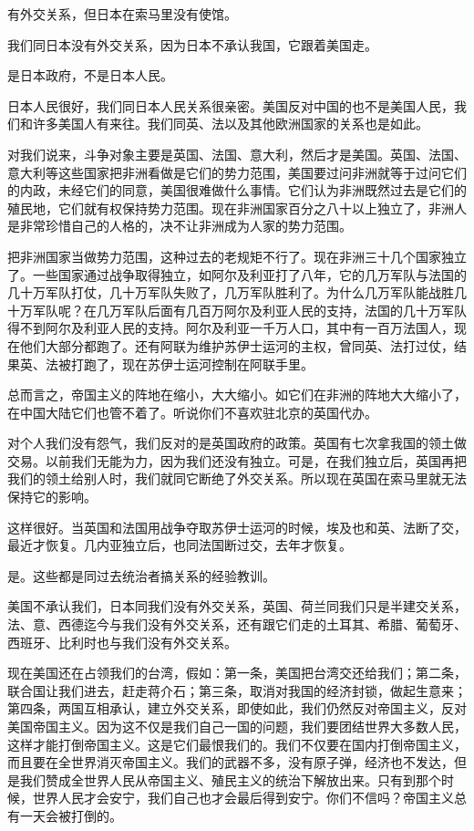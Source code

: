 有外交关系，但日本在索马里没有使馆。

我们同日本没有外交关系，因为日本不承认我国，它跟着美国走。

是日本政府，不是日本人民。

日本人民很好，我们同日本人民关系很亲密。美国反对中国的也不是美国人民，我们和许多美国人有来往。我们同英、法以及其他欧洲国家的关系也是如此。

对我们说来，斗争对象主要是英国、法国、意大利，然后才是美国。英国、法国、意大利等这些国家把非洲看做是它们的势力范围，美国要过问非洲就等于过问它们的内政，未经它们的同意，美国很难做什么事情。它们认为非洲既然过去是它们的殖民地，它们就有权保持势力范围。现在非洲国家百分之八十以上独立了，非洲人是非常珍惜自己的人格的，决不让非洲成为人家的势力范围。

把非洲国家当做势力范围，这种过去的老规矩不行了。现在非洲三十几个国家独立了。一些国家通过战争取得独立，如阿尔及利亚打了八年，它的几万军队与法国的几十万军队打仗，几十万军队失败了，几万军队胜利了。为什么几万军队能战胜几十万军队呢？在几万军队后面有几百万阿尔及利亚人民的支持，法国的几十万军队得不到阿尔及利亚人民的支持。阿尔及利亚一千万人口，其中有一百万法国人，现在他们大部分都跑了。还有阿联为维护苏伊士运河的主权，曾同英、法打过仗，结果英、法被打跑了，现在苏伊士运河控制在阿联手里。

总而言之，帝国主义的阵地在缩小，大大缩小。如它们在非洲的阵地大大缩小了，在中国大陆它们也管不着了。听说你们不喜欢驻北京的英国代办。

对个人我们没有怨气，我们反对的是英国政府的政策。英国有七次拿我国的领土做交易。以前我们无能为力，因为我们还没有独立。可是，在我们独立后，英国再把我们的领土给别人时，我们就同它断绝了外交关系。所以现在英国在索马里就无法保持它的影响。

这样很好。当英国和法国用战争夺取苏伊士运河的时候，埃及也和英、法断了交，最近才恢复。几内亚独立后，也同法国断过交，去年才恢复。

是。这些都是同过去统治者搞关系的经验教训。

美国不承认我们，日本同我们没有外交关系，英国、荷兰同我们只是半建交关系，法、意、西德迄今与我们没有外交关系，还有跟它们走的土耳其、希腊、葡萄牙、西班牙、比利时也与我们没有外交关系。

现在美国还在占领我们的台湾，假如：第一条，美国把台湾交还给我们；第二条，联合国让我们进去，赶走蒋介石；第三条，取消对我国的经济封锁，做起生意来；第四条，两国互相承认，建立外交关系，即使如此，我们仍然反对帝国主义，反对美国帝国主义。因为这不仅是我们自己一国的问题，我们要团结世界大多数人民，这样才能打倒帝国主义。这是它们最恨我们的。我们不仅要在国内打倒帝国主义，而且要在全世界消灭帝国主义。我们的武器不多，没有原子弹，经济也不发达，但是我们赞成全世界人民从帝国主义、殖民主义的统治下解放出来。只有到那个时候，世界人民才会安宁，我们自己也才会最后得到安宁。你们不信吗？帝国主义总有一天会被打倒的。

